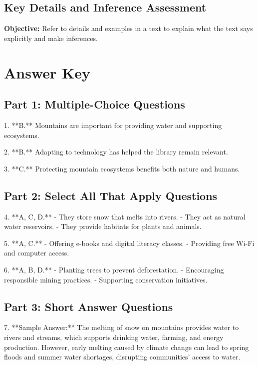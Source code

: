 \documentclass[12pt]{article}
\begin{document}
\subsection*{Key Details and Inference Assessment}
\onehalfspacing

\begin{tcolorbox}[colframe=black!40, colback=gray!0, title=Learning Objective]
\textbf{Objective:} Refer to details and examples in a text to explain what the text says explicitly and make inferences.
\end{tcolorbox}


\section*{Answer Key}

\subsection*{Part 1: Multiple-Choice Questions}

1. **B.** Mountains are important for providing water and supporting ecosystems.

2. **B.** Adapting to technology has helped the library remain relevant.

3. **C.** Protecting mountain ecosystems benefits both nature and humans.

\subsection*{Part 2: Select All That Apply Questions}

4. **A, C, D.**  
   - They store snow that melts into rivers.  
   - They act as natural water reservoirs.  
   - They provide habitats for plants and animals.

5. **A, C.**  
   - Offering e-books and digital literacy classes.  
   - Providing free Wi-Fi and computer access.

6. **A, B, D.**  
   - Planting trees to prevent deforestation.  
   - Encouraging responsible mining practices.  
   - Supporting conservation initiatives.

\subsection*{Part 3: Short Answer Questions}

7. **Sample Answer:** The melting of snow on mountains provides water to rivers and streams, which supports drinking water, farming, and energy production. However, early melting caused by climate change can lead to spring floods and summer water shortages, disrupting communities' access to water.
\end{document}
